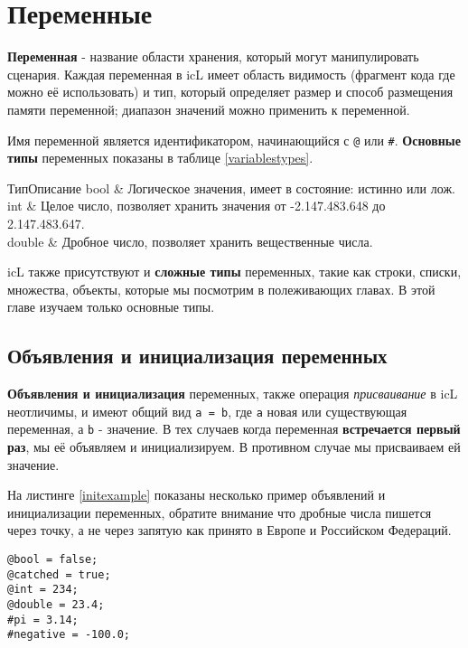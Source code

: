 \documentclass[a4paper, 14pt]{extarticle}
\begin{document}
\newpage
\section{Переменные}

\textbf{Переменная} - название области хранения, который могут манипулировать сценария. Каждая переменная в icL имеет область видимость (фрагмент кода где можно её использовать) и тип, который определяет размер и способ размещения памяти переменной; диапазон значений можно применить к переменной.

Имя переменной является идентификатором, начинающийся с \lstinline`@` или {\color{blue2}\lstinline`#`}.
\textbf{Основные типы} переменных показаны в таблице \ref{variablestypes}.

%
{Тип}{Описание}%
{
	bool   & Логическое значения, имеет в состояние: истинно или лож. 					 \\ \hline
	int    & Целое число, позволяет хранить значения от -2.147.483.648 до 2.147.483.647. \\ \hline
	double & Дробное число, позволяет хранить вещественные числа. 						 \\
}

icL также присутствуют и \textbf{сложные типы} переменных, такие как строки, списки, множества, объекты, которые мы посмотрим в полеживающих главах. В этой главе изучаем только основные типы.

\subsection{Объявления и инициализация переменных}

\textbf{Объявления и инициализация} переменных, также операция \textit{присваивание} в icL неотличимы, и имеют общий вид \lstinline`a = b`, где \lstinline`a` новая или существующая переменная, а \lstinline`b` - значение. В тех случаев когда переменная \textbf{встречается первый раз}, мы её объявляем и инициализируем. В противном случае мы присваиваем ей значение.

На листинге \ref{initexample} показаны несколько пример объявлений и инициализации переменных, обратите внимание что дробные числа пишется через точку, а не через запятую как принято в Европе и Российском Федераций.

\begin{lstlisting}[caption=Пример объявлений и инициализации переменных,label=initexample]
@bool = false;
@catched = true;
@int = 234;
@double = 23.4;
#pi = 3.14;
#negative = -100.0;
\end{lstlisting}
\end{document}
